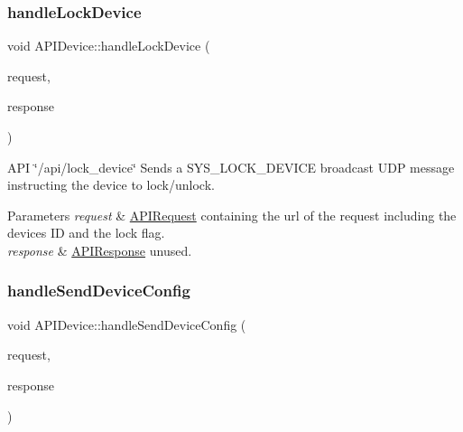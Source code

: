 \subsubsection{\texorpdfstring{handle\+Lock\+Device}{handleLockDevice}}
{\footnotesize\ttfamily void A\+P\+I\+Device\+::handle\+Lock\+Device (\begin{DoxyParamCaption}\item[{const \hyperlink{class_a_p_i_request}{A\+P\+I\+Request} \&}]{request,  }\item[{\hyperlink{class_a_p_i_response}{A\+P\+I\+Response} $\ast$}]{response }\end{DoxyParamCaption})\hspace{0.3cm}{\ttfamily [slot]}}

A\+PI \char`\"{}/api/lock\+\_\+device\char`\"{} Sends a S\+Y\+S\+\_\+\+L\+O\+C\+K\+\_\+\+D\+E\+V\+I\+CE broadcast U\+DP message instructing the device to lock/unlock. 
\begin{DoxyParams}{Parameters}
{\em request} & \hyperlink{class_a_p_i_request}{A\+P\+I\+Request} containing the url of the request including the device\textquotesingle{}s ID and the lock flag. \\
\hline
{\em response} & \hyperlink{class_a_p_i_response}{A\+P\+I\+Response} unused. \\
\hline
\end{DoxyParams}
\mbox{\label{class_a_p_i_device_a794458df71d6f24a8b8dccbbdf9235da}} 
\subsubsection{\texorpdfstring{handle\+Send\+Device\+Config}{handleSendDeviceConfig}}
{\footnotesize\ttfamily void A\+P\+I\+Device\+::handle\+Send\+Device\+Config (\begin{DoxyParamCaption}\item[{const \hyperlink{class_a_p_i_request}{A\+P\+I\+Request} \&}]{request,  }\item[{\hyperlink{class_a_p_i_response}{A\+P\+I\+Response} $\ast$}]{response }\end{DoxyParamCaption})\hspace{0.3cm}{\ttfamily [slot]}}

